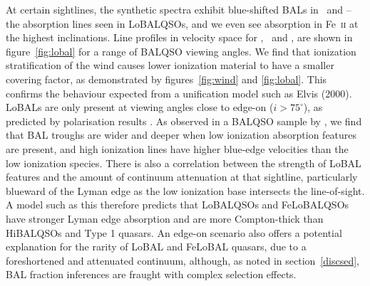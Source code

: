 \documentclass[useAMS,usenatbib]{mn2e_x}
\begin{document}
At certain sightlines, the synthetic spectra exhibit blue-shifted BALs in \al\ and \mg --
the absorption lines seen in LoBALQSOs, and we even see absorption in Fe~\textsc{ii}
at the highest inclinations. Line profiles in velocity space 
for \civ, \al\ and \mg, are shown in figure~\ref{fig:lobal} for a range
of BALQSO viewing angles. We find that ionization stratification
of the wind causes lower ionization material to have a smaller covering factor, 
as demonstrated by figures~\ref{fig:wind} and \ref{fig:lobal}.
This confirms the behaviour expected from a unification model such as Elvis (2000). 
LoBALs are only present at viewing angles close to edge-on ($i>75^\circ$),
as predicted by polarisation results \citep{brotherton1997}.
As observed in a BALQSO sample by \cite{filizak2014}, we find that
BAL troughs are wider and deeper when low ionization absorption features are present,
and high ionization lines have higher blue-edge velocities than the 
low ionization species.
There is also a correlation between the strength of LoBAL features
and the amount of continuum attenuation at that sightline, particularly
blueward of the Lyman edge as the low ionization base 
intersects the line-of-sight. 
A model such as this therefore predicts that LoBALQSOs and FeLoBALQSOs 
have stronger Lyman edge absorption and 
are more Compton-thick than HiBALQSOs and Type 1 quasars.
An edge-on scenario also offers a potential explanation for the rarity of LoBAL and
FeLoBAL quasars, due to a foreshortened and attenuated continuum, 
although, as noted in section~\ref{discsed}, BAL fraction 
inferences are fraught with complex selection effects.








\end{document}
